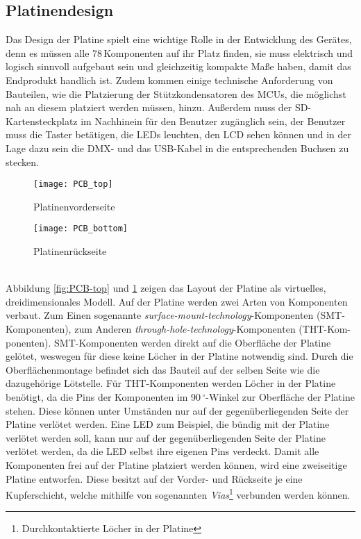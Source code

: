 
\subsection{Platinendesign} \label{sec:PCB-Design}
Das Design der Platine spielt eine wichtige Rolle in der Entwicklung des Gerätes, denn es müssen alle 78\,Komponenten auf ihr Platz finden, sie muss elektrisch und logisch sinnvoll aufgebaut sein und gleichzeitig kompakte Maße haben, damit das Endprodukt handlich ist. Zudem kommen einige technische Anforderung von Bauteilen, wie die Platzierung der Stützkondensatoren des MCUs, die möglichst nah an diesem platziert werden müssen, hinzu. Außerdem muss der SD-Kartensteckplatz im Nachhinein für den Benutzer zugänglich sein, der Benutzer muss die Taster betätigen, die LEDs leuchten, den LCD sehen können und in der Lage dazu sein die DMX- und das USB-Kabel in die entsprechenden Buchsen zu stecken.
\begin{figure}[h]
	\centering
	\begin{minipage}[t]{0.47\linewidth}
		\centering
		\texttt{[image: PCB\_top]}
		\caption{Platinenvorderseite}
		\label{fig:PCB-top}
	\end{minipage}
	\hfil
	\begin{minipage}[t]{0.47\linewidth}
		\centering
		\texttt{[image: PCB\_bottom]}
		\caption{Platinenrückseite}
		\label{fig:PCB-bottom}
	\end{minipage}
\end{figure}\\
Abbildung \ref{fig:PCB-top} und \ref{fig:PCB-bottom} zeigen das Layout der Platine als virtuelles, dreidimensionales Modell. 
Auf der Platine werden zwei Arten von Komponenten verbaut. Zum Einen sogenannte \textit{surface-mount-technology}-Komponenten (SMT-Komponenten), zum Anderen \textit{through-hole-technology}-Komponenten (THT-Kom-ponenten). SMT-Komponenten werden direkt auf die Oberfläche der Platine gelötet, weswegen für diese keine Löcher in der Platine notwendig sind. Durch die Oberflächenmontage befindet sich das Bauteil auf der selben Seite wie die dazugehörige Lötstelle. Für THT-Komponenten werden Löcher in der Platine benötigt, da die Pins der Komponenten im 90\,$^\circ$-Winkel zur Oberfläche der Platine stehen. Diese können unter Umständen nur auf der gegenüberliegenden Seite der Platine verlötet werden. Eine LED zum Beispiel, die bündig mit der Platine verlötet werden soll, kann nur auf der gegenüberliegenden Seite der Platine verlötet werden, da die LED selbst ihre eigenen Pins verdeckt. Damit alle Komponenten frei auf der Platine platziert werden können, wird eine zweiseitige Platine entworfen. Diese besitzt auf der Vorder- und Rückseite je eine Kupferschicht, welche mithilfe von sogenannten \textit{Vias}\footnote{Durchkontaktierte Löcher in der Platine} verbunden werden können.
